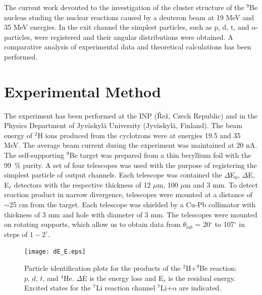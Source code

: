 \documentclass[10pt]{iopart}
\begin{document}
The current work devouted to the investigation of the cluster structure of the ${}^9$Be nucleus studing the nuclear reactions caused by a deuteron beam at 19 MeV and 35 MeV energies. In the exit channel the simplest particles, such as p, d, t, and $\alpha$-particles, were registered and their angular distributions were obtained.
A comparative analysis of experimental data and theoretical calculations has been performed.

\section{Experimental Method}
The experiment has been performed at the INP (\v{R}e\v{z}, Czech Republic) and  in the Physics Department of Jyv\"{a}skyl\"{a} University (Jyv\"askyl\"a, Finland).  The beam energy of ${}^2$H ions produced from the cyclotrons were at energies 19.5 and 35 MeV. The average beam current during the experiment was maintained at 20 nA. The self-supporting ${}^9$Be target was prepared from a thin beryllium foil with the 99~\% purity. A set of four telescopes was used with the purpose of registering the simplest particle of output channels. Each telescope was  contained the $\Delta$E$_0$, $\Delta$E, E$_r$ detectors with the respective thickness of 12 $\mu$m, 100 $\mu$m and 3 mm.
To detect reaction product in narrow divergence,  telescopes were mounted at a distance of $\sim$25 cm from the target. Each telescope was shielded by a Cu-Pb collimator with thickness of 3 mm and hole with diameter of 3 mm. The telescopes were mounted on rotating supports, which allow us to obtain data from $\theta_{lab}$ = 20$^\circ$ to 107$^\circ$ in steps of $1-2^\circ$.

\begin{figure}[tp]
\centering
\texttt{[image: dE\_E.eps]}
\caption{Particle identification plots for the products of the ${}^{2}$H+$^9$Be reaction: $p$, $d$, $t$, and ${}^{4}$He. $\Delta$E is the energy loss and E$_r$ is the residual energy. Excited states for the ${}^7$Li reaction channel ${}^7$Li+$\alpha$ are indicated.}
\label{fig1}
\end{figure}
\end{document}
